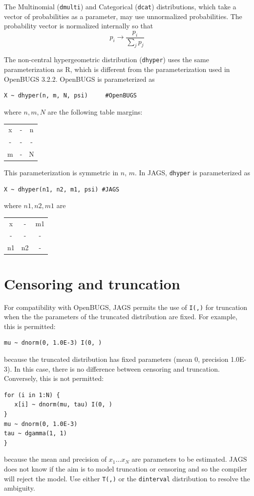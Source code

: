 \documentclass[11pt, a4paper, titlepage]{report}
\newcommand{\R}{\textsf{R}}
\begin{document}
{The Multinomial (\verb+dmulti+) and Categorical (\verb+dcat+)
distributions, which take a vector of probabilities as a parameter,
may use unnormalized probabilities. The probability vector is
normalized internally so that
\[
p_i \rightarrow \frac{p_i}{\sum_j p_j}
\]

The non-central hypergeometric distribution (\verb+dhyper+) uses the
same parameterization as \R, which is different from the
parameterization used in OpenBUGS 3.2.2. OpenBUGS is parameterized as
\begin{verbatim}
X ~ dhyper(n, m, N, psi)     #OpenBUGS
\end{verbatim}
where $n, m, N$ are the following table margins:
\begin{center}
\begin{tabular}{|cc|c|}
\hline
x & - & n \\
-  & - & -  \\
\hline
m & - & N \\
\hline
\end{tabular}
\end{center}
This parameterization is symmetric in $n$, $m$. In JAGS, \verb+dhyper+
is parameterized as
\begin{verbatim}
X ~ dhyper(n1, n2, m1, psi) #JAGS 
\end{verbatim}
where $n1, n2, m1$ are
\begin{center}
\begin{tabular}{|cc|c|}
\hline
x & - & m1 \\
-  & - & -   \\
\hline
n1 & n2 & - \\
\hline
\end{tabular}
\end{center}

\section{Censoring and truncation}

For compatibility with OpenBUGS, JAGS permits the use of \texttt{I(,)}
for truncation when the the parameters of the truncated distribution
are fixed.  For example, this is permitted:
\begin{verbatim}
mu ~ dnorm(0, 1.0E-3) I(0, )
\end{verbatim}
because the truncated distribution has fixed parameters (mean 0,
precision 1.0E-3).  In this case, there is no difference between 
censoring and truncation.  Conversely, this is not permitted:
\begin{verbatim}
for (i in 1:N) {
   x[i] ~ dnorm(mu, tau) I(0, )
}
mu ~ dnorm(0, 1.0E-3)
tau ~ dgamma(1, 1)
}
\end{verbatim}
because the mean and precision of $x_1 \dots x_N$ are parameters to be
estimated.  JAGS does not know if the aim is to model truncation or censoring
and so the compiler will reject the model. Use either \texttt{T(,)} or the
\texttt{dinterval} distribution to resolve the ambiguity.

}
\end{document}
